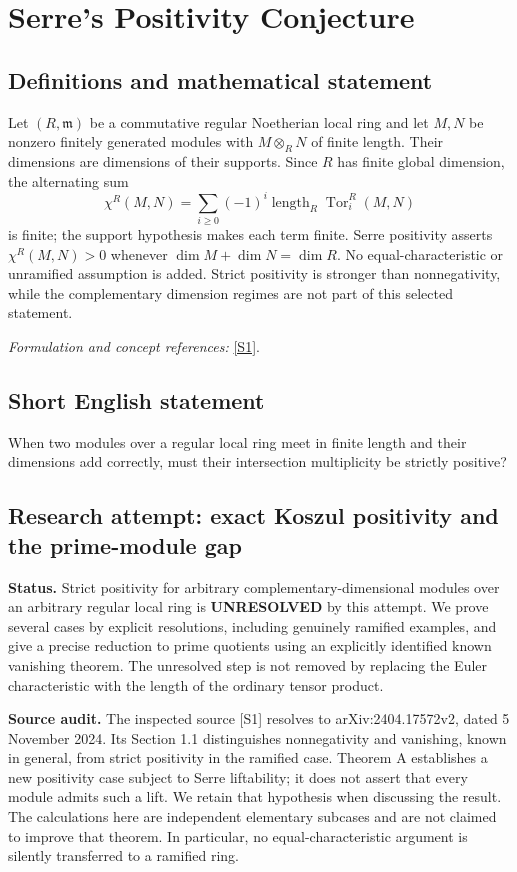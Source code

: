 \documentclass[11pt]{article}
\begin{document}
\section*{\texorpdfstring{Serre's Positivity Conjecture}{Serre's Positivity Conjecture}}\label{1469}
\subsection{Definitions and mathematical statement}
Let $(R,\mathfrak m)$ be a commutative regular Noetherian local ring and let $M,N$ be nonzero finitely generated modules with $M\otimes_RN$ of finite length. Their dimensions are dimensions of their supports. Since $R$ has finite global dimension, the alternating sum
\[
 \chi^R(M,N)=\sum_{i\ge0}(-1)^i
 \operatorname{length}_R\operatorname{Tor}_i^R(M,N)
\]
is finite; the support hypothesis makes each term finite. Serre positivity asserts $\chi^R(M,N)>0$ whenever $\dim M+\dim N=\dim R$. No equal-characteristic or unramified assumption is added. Strict positivity is stronger than nonnegativity, while the complementary dimension regimes are not part of this selected statement.
\par\smallskip\textit{Formulation and concept references:} \href{https://arxiv.org/html/2404.17572}{[S1]}.

\subsection{Short English statement}
When two modules over a regular local ring meet in finite length and their dimensions add correctly, must their intersection multiplicity be strictly positive?
\subsection{Research attempt: exact Koszul positivity and the prime-module gap}
\textbf{Status.} Strict positivity for arbitrary complementary-dimensional modules over an arbitrary regular local ring is \textbf{UNRESOLVED} by this attempt. We prove several cases by explicit resolutions, including genuinely ramified examples, and give a precise reduction to prime quotients using an explicitly identified known vanishing theorem. The unresolved step is not removed by replacing the Euler characteristic with the length of the ordinary tensor product.

\textbf{Source audit.} The inspected source [S1] resolves to arXiv:2404.17572v2, dated 5 November 2024. Its Section 1.1 distinguishes nonnegativity and vanishing, known in general, from strict positivity in the ramified case. Theorem A establishes a new positivity case subject to Serre liftability; it does not assert that every module admits such a lift. We retain that hypothesis when discussing the result. The calculations here are independent elementary subcases and are not claimed to improve that theorem. In particular, no equal-characteristic argument is silently transferred to a ramified ring.
\end{document}
